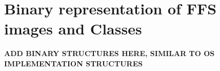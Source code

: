 \renewcommand{\chaptermark}[1]{\markboth{Appendix \thechapter\relax:\thinspace\relax#1}{}}
\chapter{Binary representation of FFS images and Classes}
\label{app:binary_rep}

\textbf{ADD BINARY STRUCTURES HERE, SIMILAR TO OS IMPLEMENTATION STRUCTURES}